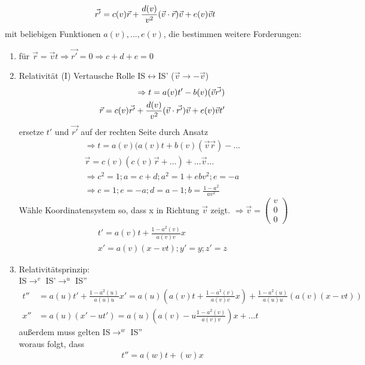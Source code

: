 \begin{description}
\begin{itemize}
\begin{align*}
\vec{r'}=c(v)		\vec{r}+\frac{d(v)}{v^2}	(\vec{v}\cdot\vec{r})\vec{v}+e(v)		\vec{v}t
\end{align*}
mit beliebigen Funktionen $a(v),...,e(v)$, die bestimmen weitere Forderungen:
\end{itemize}
\begin{enumerate}
\item für $\vec{r}=\vec{v}t \Rightarrow \vec{r'}=0 \Rightarrow c+d+e=0$
\item Relativität (I) Vertausche Rolle IS$\leftrightarrow$IS' ($\vec{v}\rightarrow-\vec{v}$)\\
\begin{align*}
\Rightarrow t=a(v)t'-b(v)(\vec{v}\vec{r'})\\
\vec{r}=c(v)\vec{r'}+\frac{d(v)}{v^2}(\vec{v}\cdot\vec{r'})\vec{v}+e(v)\vec{v}t'
\end{align*}
ersetze $t'$ und $\vec{r'}$ auf der rechten Seite durch Ansatz\\
\begin{align*}\Rightarrow t=a(v)(a(v)t+b(v)(\vec{v}\vec{r})-...\\
\vec{r}=c(v)(c(v)\vec{r}+...)+...\vec{v}...\\
\Rightarrow c^2=1; a=c+d; a^2=1+ebv^2; e=-a\\
\Rightarrow c=1; e=-a; d=a-1; b=\frac{1-a^2}{av^2}
\end{align*}
Wähle Koordinatensystem so, dass x in Richtung $\vec{v}$ zeigt.
$\Rightarrow \vec{v}=\begin{pmatrix}
v\\
0\\
0
\end{pmatrix}$
\begin{align*}
t'=a(v)t+\frac{1-a^2(v)}{a(v)v}x\\
x'=a(v)(x-vt); y'=y; z'=z
\end{align*}
\item Relativitätsprinzip:\\
IS$\rightarrow^v$ IS'$\rightarrow^u$ IS''\\
\begin{align*}
t'' &=a(u)t'+\frac{1-a^2(u)}{a(u)u}x'=a(u)(a(v)t+\frac{1-a^2(v)}{a(v)v}x)+\frac{1-a^2(u)}{a(u)u}(a(v)(x-vt))\\
x'' &=a(u)(x'-ut')=a(u)(a(v)-u\frac{1-a^2(v)}{a(v)v})x+...t
\end{align*}
außerdem muss gelten IS$\rightarrow^w$ IS''\\
woraus folgt, dass
\begin{align*}
t''=a(w)t+(w)x\\

\end{align*}
\end{enumerate}
\end{description}
